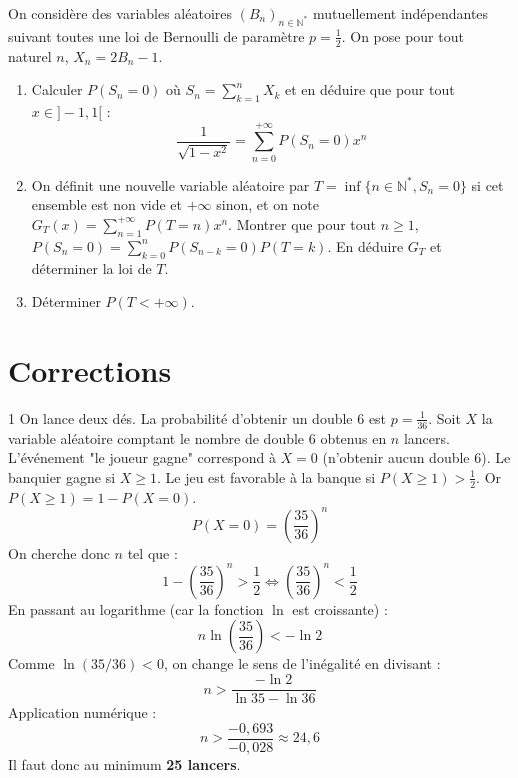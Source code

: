 \begin{exercice}
On considère des variables aléatoires $(B_{n})_{n\in\mathbb{N}^{*}}$ mutuellement indépendantes suivant toutes une loi de Bernoulli de paramètre $p=\frac{1}{2}$. On pose pour tout naturel $n$, $X_{n}=2B_{n}-1$.
\begin{enumerate}
    \item Calculer $P(S_{n}=0)$ où $S_{n}=\sum_{k=1}^{n}X_{k}$ et en déduire que pour tout $x\in]-1,1[$ :
    $$ \frac{1}{\sqrt{1-x^{2}}}=\sum_{n=0}^{+ \infty}P(S_{n}=0)x^{n} $$
    \item On définit une nouvelle variable aléatoire par $T=\inf\{n\in\mathbb{N}^{*},S_{n}=0\}$ si cet ensemble est non vide et $+\infty$ sinon, et on note $G_{T}(x)=\sum_{n=1}^{+\infty}P(T=n)x^{n}.$
    Montrer que pour tout $n\ge1$, $P(S_{n}=0)=\sum_{k=0}^{n}P(S_{n-k}=0)P(T=k)$.
    En déduire $G_{T}$ et déterminer la loi de $T$.
    \item Déterminer $P(T<+\infty)$.
\end{enumerate}
\end{exercice}

\section{Corrections}
\begin{correction}{1}
On lance deux dés. La probabilité d'obtenir un double 6 est $p = \frac{1}{36}$.
Soit $X$ la variable aléatoire comptant le nombre de double 6 obtenus en $n$ lancers.
L'événement "le joueur gagne" correspond à $X=0$ (n'obtenir aucun double 6). Le banquier gagne si $X \ge 1$.
Le jeu est favorable à la banque si $P(X \ge 1) > \frac{1}{2}$.
Or $P(X \ge 1) = 1 - P(X=0)$.
$$ P(X=0) = \left( \frac{35}{36} \right)^n $$
On cherche donc $n$ tel que :
$$ 1 - \left( \frac{35}{36} \right)^n > \frac{1}{2} \iff \left( \frac{35}{36} \right)^n < \frac{1}{2} $$
En passant au logarithme (car la fonction $\ln$ est croissante) :
$$ n \ln\left( \frac{35}{36} \right) < -\ln 2 $$
Comme $\ln(35/36) < 0$, on change le sens de l'inégalité en divisant :
$$ n > \frac{-\ln 2}{\ln 35 - \ln 36} $$
Application numérique :
$$ n > \frac{-0,693}{-0,028} \approx 24,6 $$
Il faut donc au minimum \textbf{25 lancers}.
\end{correction}

